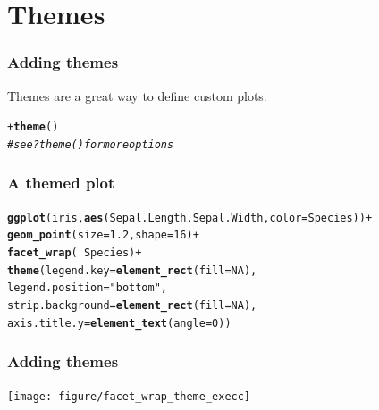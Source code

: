 \documentclass{beamer}\usepackage[]{graphicx}\usepackage[]{color}
\makeatletter
\newcommand{\hlstr}[1]{\textcolor[rgb]{0.192,0.494,0.8}{#1}}%
\newcommand{\hlcom}[1]{\textcolor[rgb]{0.678,0.584,0.686}{\textit{#1}}}%
\newcommand{\hlkwd}[1]{\textcolor[rgb]{0.737,0.353,0.396}{\textbf{#1}}}%
\newenvironment{kframe}{%
 \def\at@end@of@kframe{}%
 \ifinner\ifhmode%
  \def\at@end@of@kframe{\end{minipage}}%
  \begin{minipage}{\columnwidth}%
 \fi\fi%
 \def\FrameCommand##1{\hskip\@totalleftmargin \hskip-\fboxsep
 \colorbox{shadecolor}{##1}\hskip-\fboxsep
     \hskip-\linewidth \hskip-\@totalleftmargin \hskip\columnwidth}%
 \MakeFramed {\advance\hsize-\width
   \@totalleftmargin\z@ \linewidth\hsize
   \@setminipage}}%
 {\par\unskip\endMakeFramed%
 \at@end@of@kframe}
\newenvironment{knitrout}{}{} %
\makeatother
\begin{document}

\section*{Themes}
\frame{\sectionpage}


\begin{frame}[fragile]
\frametitle{Adding themes}
Themes are a great way to define custom plots.
\begin{knitrout}\footnotesize
{}\color{fgcolor}\begin{kframe}
\begin{alltt}
+\hlkwd{theme}()
\hlcom{# see ?theme() for more options}
\end{alltt}
\end{kframe}
\end{knitrout}

\end{frame}


\begin{frame}[fragile]
\frametitle{A themed plot}
\begin{knitrout}\footnotesize
{}\color{fgcolor}\begin{kframe}
\begin{alltt}
\hlkwd{ggplot}(iris, \hlkwd{aes}(Sepal.Length, Sepal.Width, color = Species)) +
\hlkwd{geom_point}(size = 1.2, shape = 16) +
\hlkwd{facet_wrap}( ~ Species) +
\hlkwd{theme}(legend.key = \hlkwd{element_rect}(fill = NA),
legend.position = \hlstr{"bottom"},
strip.background = \hlkwd{element_rect}(fill = NA),
axis.title.y = \hlkwd{element_text}(angle = 0))
\end{alltt}
\end{kframe}
\end{knitrout}

\end{frame}


\begin{frame}[fragile]
\frametitle{Adding themes}
\begin{knitrout}\footnotesize
{}\color{fgcolor}
\texttt{[image: figure/facet\_wrap\_theme\_execc]} 

\end{knitrout}

\end{frame}
\end{document}
